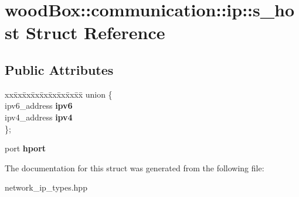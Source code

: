 \hypertarget{structwood_box_1_1communication_1_1ip_1_1s__host}{}\section{wood\+Box\+:\+:communication\+:\+:ip\+:\+:s\+\_\+host Struct Reference}
\label{structwood_box_1_1communication_1_1ip_1_1s__host}
\subsection*{Public Attributes}
\begin{DoxyCompactItemize}
\item 
\mbox{\label{structwood_box_1_1communication_1_1ip_1_1s__host_ab867830a8b43080c199f4006067b2c22}} 
\begin{tabbing}
xx\=xx\=xx\=xx\=xx\=xx\=xx\=xx\=xx\=\kill
union \{\\
\>ipv6\_address {\bfseries ipv6}\\
\>ipv4\_address {\bfseries ipv4}\\
\}; \\

\end{tabbing}\item 
\mbox{\label{structwood_box_1_1communication_1_1ip_1_1s__host_ae4df433233593fc00345f6372f78bd37}} 
port {\bfseries hport}
\end{DoxyCompactItemize}


The documentation for this struct was generated from the following file\+:\begin{DoxyCompactItemize}
\item 
network\+\_\+ip\+\_\+types.\+hpp\end{DoxyCompactItemize}
